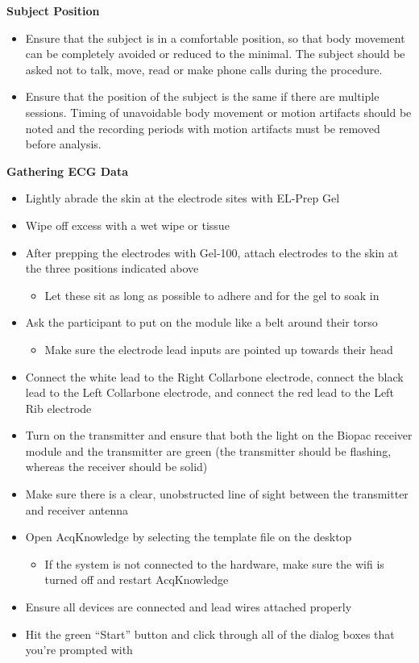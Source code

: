 \documentclass[]{book}
\providecommand{\tightlist}{%
  \setlength{\itemsep}{0pt}\setlength{\parskip}{0pt}}
\begin{document}
\textbf{Subject Position}

\begin{itemize}
\tightlist
\item
  Ensure that the subject is in a comfortable position, so that body movement can be completely avoided or reduced to the minimal. The subject should be asked not to talk, move, read or make phone calls during the procedure.
\item
  Ensure that the position of the subject is the same if there are multiple sessions. Timing of unavoidable body movement or motion artifacts should be noted and the recording periods with motion artifacts must be removed before analysis.
\end{itemize}

\textbf{Gathering ECG Data}

\begin{itemize}
\tightlist
\item
  Lightly abrade the skin at the electrode sites with EL-Prep Gel
\item
  Wipe off excess with a wet wipe or tissue
\item
  After prepping the electrodes with Gel-100, attach electrodes to the skin at the three positions indicated above

  \begin{itemize}
  \tightlist
  \item
    Let these sit as long as possible to adhere and for the gel to soak in
  \end{itemize}
\item
  Ask the participant to put on the module like a belt around their torso

  \begin{itemize}
  \tightlist
  \item
    Make sure the electrode lead inputs are pointed up towards their head
  \end{itemize}
\item
  Connect the white lead to the Right Collarbone electrode, connect the black lead to the Left Collarbone electrode, and connect the red lead to the Left Rib electrode
\item
  Turn on the transmitter and ensure that both the light on the Biopac receiver module and the transmitter are green (the transmitter should be flashing, whereas the receiver should be solid)
\item
  Make sure there is a clear, unobstructed line of sight between the transmitter and receiver antenna
\item
  Open AcqKnowledge by selecting the template file on the desktop

  \begin{itemize}
  \tightlist
  \item
    If the system is not connected to the hardware, make sure the wifi is turned off and restart AcqKnowledge
  \end{itemize}
\item
  Ensure all devices are connected and lead wires attached properly
\item
  Hit the green ``Start'' button and click through all of the dialog boxes that you're prompted with
\end{itemize}
\end{document}
